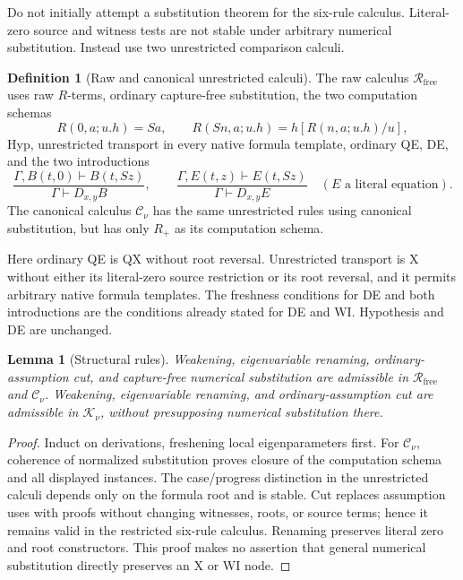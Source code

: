 \documentclass[11pt]{article}
\newtheorem{lemma}[theorem]{Lemma}
\theoremstyle{definition}
\newtheorem{definition}[theorem]{Definition}
\newcommand{\Rfree}{\mathcal R_{\mathrm{free}}}
\newcommand{\Cnorm}{\mathcal C_\nu}
\newcommand{\Knorm}{\mathcal K_\nu}
\begin{document}
Do not initially attempt a substitution theorem for the six-rule calculus. Literal-zero source and witness tests are not stable under arbitrary numerical substitution. Instead use two unrestricted comparison calculi.

\begin{definition}[Raw and canonical unrestricted calculi]
The raw calculus \(\Rfree\) uses raw \(R\)-terms, ordinary capture-free substitution, the two computation schemas
\[
R(0,a;u.h)=Sa,\qquad
R(Sn,a;u.h)=h[R(n,a;u.h)/u],
\]
Hyp, unrestricted transport in every native formula template, ordinary QE, DE, and the two introductions
\[
\frac{\Gamma,B(t,0)\vdash B(t,Sz)}
     {\Gamma\vdash D_{x,y}B},
\qquad
\frac{\Gamma,E(t,z)\vdash E(t,Sz)}
     {\Gamma\vdash D_{x,y}E}
\quad(E\text{ a literal equation}).
\]
The canonical calculus \(\Cnorm\) has the same unrestricted rules using canonical substitution, but has only \(R_+\) as its computation schema.

Here ordinary QE is QX without root reversal. Unrestricted transport is X without either its literal-zero source restriction or its root reversal, and it permits arbitrary native formula templates. The freshness conditions for DE and both introductions are the conditions already stated for DE and WI. Hypothesis and DE are unchanged.
\end{definition}

\begin{lemma}[Structural rules]\label{cr:struct}
Weakening, eigenvariable renaming, ordinary-assumption cut, and capture-free numerical substitution are admissible in \(\Rfree\) and \(\Cnorm\).
Weakening, eigenvariable renaming, and ordinary-assumption cut are admissible in \(\Knorm\), without presupposing numerical substitution there.
\end{lemma}
\begin{proof}
Induct on derivations, freshening local eigenparameters first. For \(\Cnorm\), coherence of normalized substitution proves closure of the computation schema and all displayed instances. The case/progress distinction in the unrestricted calculi depends only on the formula root and is stable. Cut replaces assumption uses with proofs without changing witnesses, roots, or source terms; hence it remains valid in the restricted six-rule calculus. Renaming preserves literal zero and root constructors. This proof makes no assertion that general numerical substitution directly preserves an X or WI node.
\end{proof}
\end{document}
